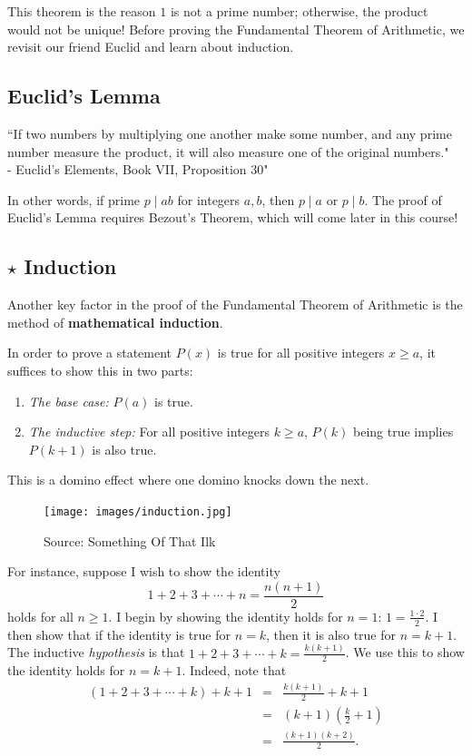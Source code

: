 This theorem is the reason $1$ is not a prime number; otherwise, the product would not be unique! Before proving the Fundamental Theorem of Arithmetic, we revisit our friend Euclid and learn about induction. 
\clearpage

\subsection{Euclid's Lemma}
\begin{displayquote} ``If two numbers by multiplying one another make some number, and any prime number measure the product, it will also measure one of the original numbers." \\ - Euclid's Elements, Book VII, Proposition 30" \end{displayquote}
In other words, if prime $p\mid ab$ for integers $a,b$, then $p\mid a$ or $p\mid b$. The proof of Euclid's Lemma requires Bezout's Theorem, which will come later in this course! 

\clearpage
\subsection{$\star$ Induction}
Another key factor in the proof of the Fundamental Theorem of Arithmetic is the method of \textbf{mathematical induction}.
	
\begin{defi}[Induction] In order to prove a statement $P(x)$ is true for all positive integers $x\ge a$, it suffices to show this in two parts: \begin{enumerate}
		\item \textit{The base case:} $P(a)$ is true.
		\item \textit{The inductive step:} For all positive integers $k\ge a$, $P(k)$ being true implies $P(k+1)$ is also true.
		\end{enumerate}  
		This is a domino effect where one domino knocks down the next.
\end{defi}

\clearpage

\begin{figure}[h]
	\centering\texttt{[image: images/induction.jpg]}
	\caption{Source: Something Of That Ilk}
\end{figure}
\clearpage

For instance, suppose I wish to show the identity $$1+2+3+\cdots+n=\frac{n(n+1)}{2}$$ holds for all $n\ge 1$.
I begin by showing the identity holds for $n=1$: $1=\frac{1\cdot 2}{2}$. I then show that if the identity is true for $n=k$, then it is also true for $n=k+1$. The inductive \textit{hypothesis} is that $1+2+3+\cdots+k=\frac{k(k+1)}{2}$. We use this to show the identity holds for $n=k+1$. Indeed, note that \begin{eqnarray*} \left(1+2+3+\cdots+k\right)+k+1 &=& \frac{k(k+1)}{2}+k+1 \\ &=& (k+1)\left(\frac{k}{2}+1\right) \\ &=& \frac{(k+1)(k+2)}{2}. \end{eqnarray*}

